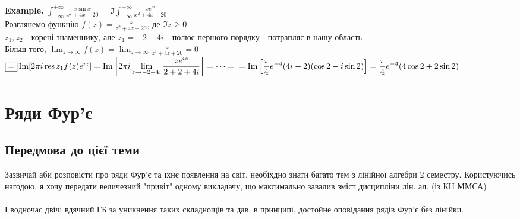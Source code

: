 \documentclass{math_library}
\begin{document}
\textbf{Example.} $\displaystyle \int_{-\infty}^{+\infty} \frac{x \sin x}{x^2+4x+20} = \Im \int_{-\infty}^{+\infty} \frac{x e^{ix}}{x^2+4x+20} \boxed{=}$\\
Розглянемо функцію $\displaystyle f(z) = \frac{z}{z^2+4z+20}$, де $\Im z \geq 0$ \\
$z_1, z_2$ - корені знаменнику, але $z_1 = -2 + 4i$ - полюс першого порядку - потрапляє в нашу область\\
Більш того, $\displaystyle \lim_{z \to \infty} f(z) = \lim_{z \to \infty} \frac{z}{z^2+4z+20} = 0$\\
$\displaystyle \boxed{=} \Im[ 2\pi i \operatorname*{res}{z_1}{f(z)e^{iz}}] = \Im\left[ 2\pi i \lim_{z \to -2+4i} \frac{ze^{iz}}{2+2+4i}\right] = \dots = \\ = \Im\left[ \frac{\pi}{4} e^{-4} (4i-2)(\cos 2 - i \sin 2) \right] = \frac{\pi}{4}e^{-4} (4\cos 2 + 2 \sin 2)$
\newpage




\section{Ряди Фур'є}
\subsection*{Передмова до цієї теми}
Зазвичай аби розповісти про ряди Фур'є та їхнє появлення на світ, необіхдно знати багато тем з лінійної алгебри 2 семестру. Користуючись нагодою, я хочу передати величезний "привіт"  одному викладачу, що максимально завалив зміст дисципліни лін. ал. (із КН ММСА)\\
\\
І водночас двічі вдячний ГБ за уникнення таких складнощів та дав, в принципі, достойне оповідання рядів Фур'є без лінійки.\\
 
\end{document}
